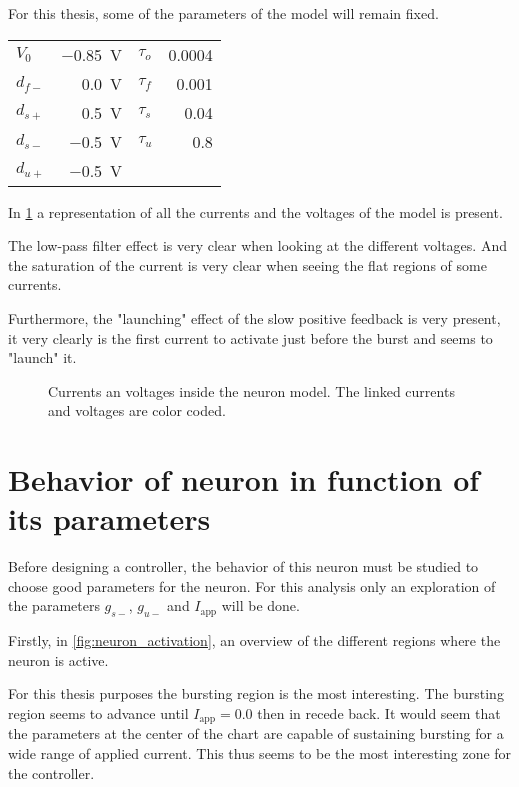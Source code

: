 For this thesis, some of the parameters of the model will remain fixed.

{

\large\centering
\begin{tabular}{lr|lr}
    $V_0$    & \qty{-0.85}{\volt} & $\tau_{o}$ & \num{0.0004}\\
    $d_{f-}$ & \qty{0.0}{\volt}   & $\tau_{f}$ & \num{0.001}\\
    $d_{s+}$ & \qty{0.5}{\volt}   & $\tau_{s}$ & \num{0.04}\\
    $d_{s-}$ & \qty{-0.5}{\volt}  & $\tau_{u}$ & \num{0.8}\\
    $d_{u+}$ & \qty{-0.5}{\volt}  & &
\end{tabular}

}

In \cref{fig:neuron_inside} a representation of all the currents and the voltages of the model is present. 

The low-pass filter effect is very clear when looking at the different voltages. And the saturation of the current is very clear when seeing the flat regions of some currents.

Furthermore, the "launching" effect of the slow positive feedback is very present, it very clearly is the first current to activate just before the burst and seems to "launch" it.

\begin{figure}[!htb]
    \centering
    \caption{Currents an voltages inside the neuron model. The linked currents and voltages are color coded.}
    \label{fig:neuron_inside}
\end{figure}

\section{Behavior of neuron in function of its parameters}

Before designing a controller, the behavior of this neuron must be studied to choose good parameters for the neuron. For this analysis only an exploration of the parameters $g_{s-}$, $g_{u-}$ and $I_\text{app}$ will be done.

Firstly, in \cref{fig:neuron_activation}, an overview of the different regions where the neuron is active.

For this thesis purposes the bursting region is the most interesting. The bursting region seems to advance until $I_\text{app}=0.0$ then in recede back.
It would seem that the parameters at the center of the chart are capable of sustaining bursting for a wide range of applied current. This thus seems to be the most interesting zone for the controller.

